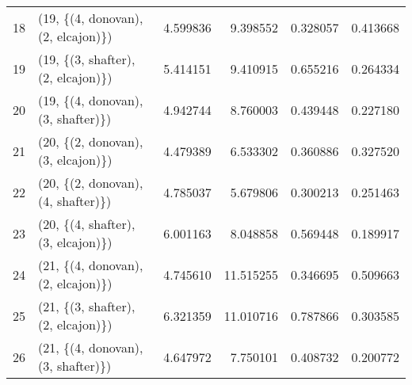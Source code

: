 \begin{tabular}{llrrrr}
18 &  (19, \{(4, donovan), (2, elcajon)\}) &  4.599836 &   9.398552 &   0.328057 &  0.413668 \\
19 &  (19, \{(3, shafter), (2, elcajon)\}) &  5.414151 &   9.410915 &   0.655216 &  0.264334 \\
20 &  (19, \{(4, donovan), (3, shafter)\}) &  4.942744 &   8.760003 &   0.439448 &  0.227180 \\
21 &  (20, \{(2, donovan), (3, elcajon)\}) &  4.479389 &   6.533302 &   0.360886 &  0.327520 \\
22 &  (20, \{(2, donovan), (4, shafter)\}) &  4.785037 &   5.679806 &   0.300213 &  0.251463 \\
23 &  (20, \{(4, shafter), (3, elcajon)\}) &  6.001163 &   8.048858 &   0.569448 &  0.189917 \\
24 &  (21, \{(4, donovan), (2, elcajon)\}) &  4.745610 &  11.515255 &   0.346695 &  0.509663 \\
25 &  (21, \{(3, shafter), (2, elcajon)\}) &  6.321359 &  11.010716 &   0.787866 &  0.303585 \\
26 &  (21, \{(4, donovan), (3, shafter)\}) &  4.647972 &   7.750101 &   0.408732 &  0.200772 \\
\bottomrule
\end{tabular}

